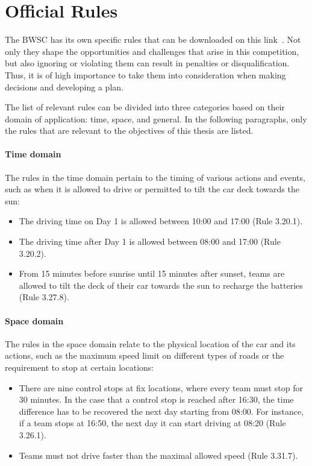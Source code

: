 \newpage
\section{Official Rules}
\label{sec:bwscRules}
The BWSC has its own specific rules that can be downloaded on this link~\cite{bwscRules:2022webpage}. Not only they shape the opportunities and challenges that arise in this competition, but also ignoring or violating them can result in penalties or disqualification. Thus, it is of high importance to take them into consideration when making decisions and developing a plan.

The list of relevant rules can be divided into three categories based on their domain of application: time, space, and general. In the following paragraphs, only the rules that are relevant to the objectives of this thesis are listed.

\paragraph{Time domain}
The rules in the time domain pertain to the timing of various actions and events, such as when it is allowed to drive or permitted to tilt the car deck towards the sun:
\begin{itemize}
	\item The driving time on Day 1 is allowed between 10:00 and 17:00 (Rule 3.20.1).
	\item The driving time after Day 1 is allowed between 08:00 and 17:00 (Rule 3.20.2).
	\item From 15 minutes before sunrise until 15 minutes after sunset, teams are allowed to tilt the deck of their car towards the sun to recharge the batteries (Rule 3.27.8).
\end{itemize}
\paragraph{Space domain}
The rules in the space domain relate to the physical location of the car and its actions, such as the maximum speed limit on different types of roads or the requirement to stop at certain locations:
\begin{itemize}
	\item There are nine control stops at fix locations, where every team must stop for 30 minutes. In the case that a control stop is reached after 16:30, the time difference has to be recovered the next day starting from 08:00. For instance, if a team stops at 16:50, the next day it can start driving at 08:20 (Rule 3.26.1).
	\item Teams must not drive faster than the maximal allowed speed (Rule 3.31.7).
\end{itemize}
